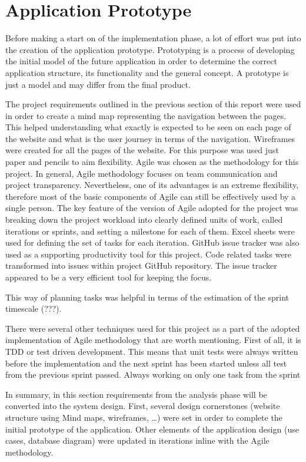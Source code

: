 \chapter{Application Prototype}\label{ch:Prototype}

Before making a start on of the implementation phase, a lot of effort was put into the creation of the application prototype. Prototyping is a process of developing the initial model of the future application in order to determine the correct application structure, its functionality and the general concept. A prototype is just a model and may differ from the final product.

The project requirements outlined in the previous section of this report were used in order to create a mind map representing the navigation between the pages. This helped understanding what exactly is expected to be seen on each page of the website and what is the user journey in terms of the navigation. Wireframes were created for all the pages of the website. For this purpose was used just paper and pencils to aim flexibility.
Agile was chosen as the methodology for this project. In general, Agile methodology focuses on team communication and project transparency. Nevertheless, one of its advantages is an extreme flexibility, therefore most of the basic components of Agile can still be effectively used by a single person. The key feature of the version of Agile adopted for the project was breaking down the project workload into clearly defined units of work, called iterations or sprints, and setting a milestone for each of them. Excel sheets were used for defining the set of tasks for each iteration. GitHub issue tracker was also used as a supporting productivity tool for this project. Code related tasks were transformed into issues within project GitHub repository. The issue tracker appeared to be a very efficient tool for keeping the focus.

This way of planning tasks was helpful in terms of the estimation of the sprint timescale (???). 

There were several other techniques used for this project as a part of the adopted implementation of Agile methodology that are worth mentioning. 
First of all, it is TDD or test driven development. This means that unit tests were always written before the implementation and the next sprint has been started unless all test from the previous sprint passed. Always working on only one task from the sprint 

In summary, in this section requirements from the analysis phase will be converted into the system design. First, several design cornerstones (website structure using Mind maps, wireframes, …) were set in order to complete the initial prototype of the application. Other elements of the application design (use cases, database diagram) were updated in iterations inline with the Agile methodology. 

